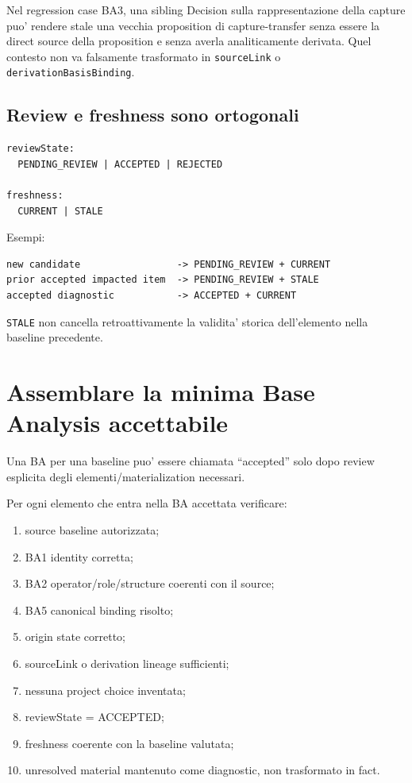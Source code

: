\documentclass[11pt,a4paper]{article}
\newcommand{\code}[1]{\nolinkurl{#1}}
\begin{document}
\begin{examplebox}
Nel regression case BA3, una sibling Decision sulla rappresentazione della capture puo' rendere stale una vecchia proposition di capture-transfer senza essere la direct source della proposition e senza averla analiticamente derivata. Quel contesto non va falsamente trasformato in \code{sourceLink} o \code{derivationBasisBinding}.
\end{examplebox}

\subsection{Review e freshness sono ortogonali}

\begin{lstlisting}
reviewState:
  PENDING_REVIEW | ACCEPTED | REJECTED

freshness:
  CURRENT | STALE
\end{lstlisting}

Esempi:

\begin{lstlisting}
new candidate                 -> PENDING_REVIEW + CURRENT
prior accepted impacted item  -> PENDING_REVIEW + STALE
accepted diagnostic           -> ACCEPTED + CURRENT
\end{lstlisting}

\code{STALE} non cancella retroattivamente la validita' storica dell'elemento nella baseline precedente.


\section{Assemblare la minima Base Analysis accettabile}

Una BA per una baseline puo' essere chiamata ``accepted'' solo dopo review esplicita degli elementi/materialization necessari.

\begin{reviewbox}
Per ogni elemento che entra nella BA accettata verificare:
\begin{enumerate}
\item source baseline autorizzata;
\item BA1 identity corretta;
\item BA2 operator/role/structure coerenti con il source;
\item BA5 canonical binding risolto;
\item origin state corretto;
\item sourceLink o derivation lineage sufficienti;
\item nessuna project choice inventata;
\item reviewState = ACCEPTED;
\item freshness coerente con la baseline valutata;
\item unresolved material mantenuto come diagnostic, non trasformato in fact.
\end{enumerate}
\end{reviewbox}
\end{document}
